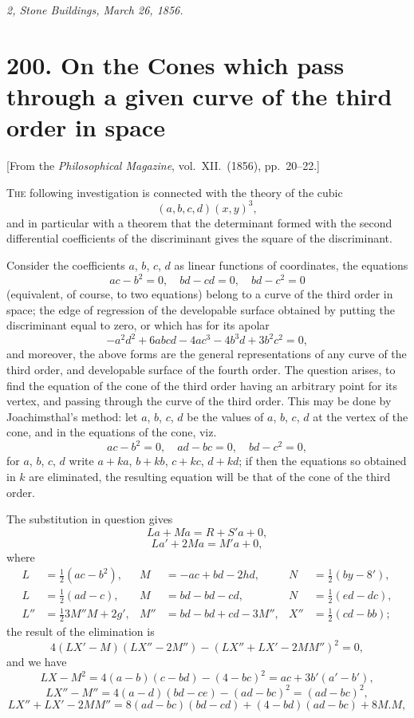 \documentclass[12pt,a4paper]{article}
\theoremstyle{definition}
\begin{document}
\bigskip

\noindent\textit{2, Stone Buildings, March 26, 1856.}

\newpage


\section*{200. On the Cones which pass through a given curve of the third order in space}

\begin{center}
[From the \textit{Philosophical Magazine}, vol.~XII.~(1856), pp.~20--22.]
\end{center}

\bigskip

T\textsc{he} following investigation is connected with the theory of the cubic
\[
(a, b, c, d)(x, y)^3,
\]
and in particular with a theorem that the determinant formed with the second
differential coefficients of the discriminant gives the square of the discriminant.

Consider the coefficients $a$, $b$, $c$, $d$ as linear functions of coordinates, the equations
\[
ac - b^2 = 0,\quad bd - cd = 0,\quad bd - c^2 = 0
\]
(equivalent, of course, to two equations) belong to a curve of the third order in space;
the edge of regression of the developable surface obtained by putting the discriminant
equal to zero, or which has for its apolar
\[
-a^2d^2 + 6abcd - 4ac^3 - 4b^3d + 3b^2c^2 = 0,
\]
and moreover, the above forms are the general representations of any curve of the
third order, and developable surface of the fourth order. The question arises, to find
the equation of the cone of the third order having an arbitrary point for its vertex,
and passing through the curve of the third order. This may be done by Joachimsthal's
method: let $a$, $b$, $c$, $d$ be the values of $a$, $b$, $c$, $d$ at the vertex of the cone, and in
the equations of the cone, viz.
\[
ac - b^2 = 0,\quad ad - bc = 0,\quad bd - c^2 = 0,
\]
for $a$, $b$, $c$, $d$ write $a + ka$, $b + kb$, $c + kc$, $d + kd$; if then the equations so obtained
in $k$ are eliminated, the resulting equation will be that of the cone of the third order.

The substitution in question gives
\[
La + Ma = R + S' a + 0,
\]
\[
La' + 2Ma = M' a + 0,
\]
where
\begin{align*}
L &= \tfrac{1}{2}(ac - b^2),& M &= -ac + bd - 2hd,& N &= \tfrac{1}{2}(by - 8'),\\
L &= \tfrac{1}{2}(ad - c),& M &= bd - bd - cd,& N &= \tfrac{1}{2}(ed - dc),\\
L'' &= \tfrac{1}{2}3M''M + 2g',& M'' &= bd - bd + cd - 3M'',& X'' &= \tfrac{1}{2}(cd - bb);
\end{align*}
the result of the elimination is
\[
4(LX' - M)(LX'' - 2M'') - (LX'' + LX' - 2MM'')^2 = 0,
\]
and we have
\[
LX - M^2 = 4(a-b)(c-bd) - (4-bc)^2 = ac + 3b'(a'-b'),
\]
\[
LX'' - M'' = 4(a-d)(bd - ce) - (ad - bc)^2 = (ad - bc)^2,
\]
\[
LX'' + LX' - 2MM'' = 8(ad - bc)(bd - cd) + (4 - bd)(ad - bc) + 8M.M,
\]
\end{document}
